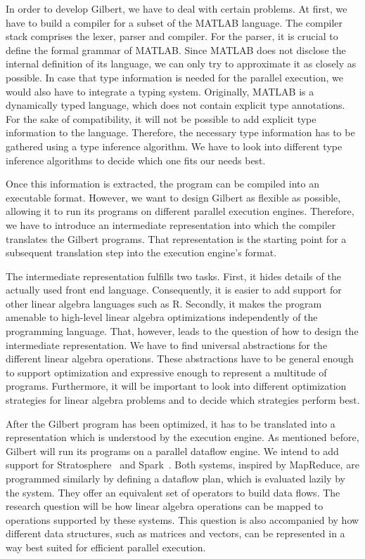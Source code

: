 In order to develop Gilbert, we have to deal with certain problems.
At first, we have to build a compiler for a subset of the MATLAB language.
The compiler stack comprises the lexer, parser and compiler.
For the parser, it is crucial to define the formal grammar of MATLAB.
Since MATLAB does not disclose the internal definition of its language, we can only try to approximate it as closely as possible.
In case that type information is needed for the parallel execution, we would also have to integrate a typing system.
Originally, MATLAB is a dynamically typed language, which does not contain explicit type annotations.
For the sake of compatibility, it will not be possible to add explicit type information to the language.
Therefore, the necessary type information has to be gathered using a type inference algorithm.
We have to look into different type inference algorithms to decide which one fits our needs best.

Once this information is extracted, the program can be compiled into an executable format.
However, we want to design Gilbert as flexible as possible, allowing it to run its programs on different parallel execution engines.
Therefore, we have to introduce an intermediate representation into which the compiler translates the Gilbert programs.
That representation is the starting point for a subsequent translation step into the execution engine's format.

The intermediate representation fulfills two tasks.
First, it hides details of the actually used front end language.
Consequently, it is easier to add support for other linear algebra languages such as R.
Secondly, it makes the program amenable to high-level linear algebra optimizations independently of the programming language.
That, however, leads to the question of how to design the intermediate representation.
We have to find universal abstractions for the different linear algebra operations.
These abstractions have to be general enough to support optimization and expressive enough to represent a multitude of programs.
Furthermore, it will be important to look into different optimization strategies for linear algebra problems and to decide which strategies perform best.

After the Gilbert program has been optimized, it has to be translated into a representation which is understood by the execution engine.
As mentioned before, Gilbert will run its programs on a parallel dataflow engine.
We intend to add support for Stratosphere~\cite{alexandrov:2011a} and Spark~\cite{zaharia:2010a}.
Both systems, inspired by MapReduce, are programmed similarly by defining a dataflow plan, which is evaluated lazily by the system.
They offer an equivalent set of operators to build data flows.
The research question will be how linear algebra operations can be mapped to operations supported by these systems.
This question is also accompanied by how different data structures, such as matrices and vectors, can be represented in a way best suited for efficient parallel execution.

